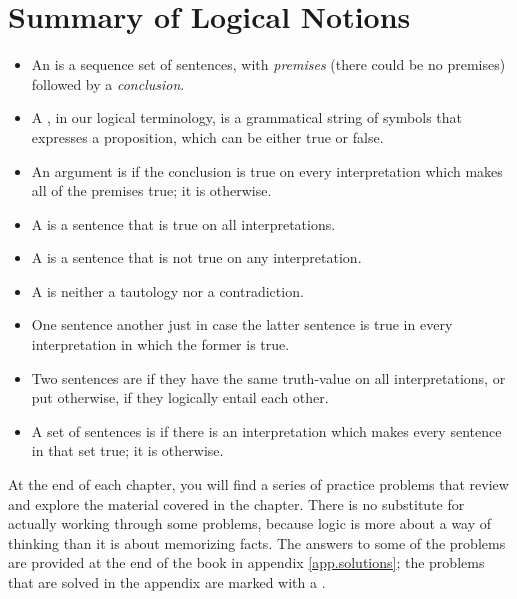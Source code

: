 \section*{Summary of Logical Notions}
\begin{itemize}

\item An  is a sequence set of sentences, with \emph{premises} (there could be no premises) followed by a \emph{conclusion}.

\item A , in our logical terminology, is a grammatical string of symbols that expresses a proposition, which can be either true or false.

\item An argument is  if the conclusion is true on every interpretation which makes all of the premises true; it is  otherwise.

\item A  is a sentence that is true on all interpretations.

\item A  is a sentence that is not true on any interpretation.

\item A  is neither a tautology nor a contradiction.

\item One sentence  another just in case the latter sentence is true in every interpretation in which the former is true.

\item Two sentences are  if they have the same truth-value on all interpretations, or put otherwise, if they logically entail each other.

\item A set of sentences is  if there is an interpretation which makes every sentence in that set true; it is  otherwise.

\end{itemize}


\iffalse %

\practiceproblems
At the end of each chapter, you will find a series of practice problems that review and explore the material covered in the chapter. There is no substitute for actually working through some problems, because logic is more about a way of thinking than it is about memorizing facts. The answers to some of the problems are provided at the end of the book in appendix \ref{app.solutions}; the problems that are solved in the appendix are marked with a \solutions.

